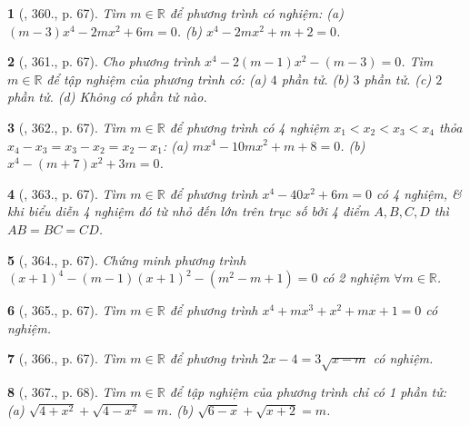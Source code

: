 \documentclass{article}
\newtheorem{baitoan}{}
\begin{document}
\begin{baitoan}[\cite{Binh_Toan_9_tap_2}, 360., p. 67]
	Tìm $m\in\mathbb{R}$ để phương trình có nghiệm: (a) $(m - 3)x^4 - 2mx^2 + 6m = 0$. (b) $x^4 - 2mx^2 + m + 2 = 0$.
\end{baitoan}

\begin{baitoan}[\cite{Binh_Toan_9_tap_2}, 361., p. 67]
	Cho phương trình $x^4 - 2(m - 1)x^2 - (m - 3) = 0$. Tìm $m\in\mathbb{R}$ để tập nghiệm của phương trình có: (a) $4$ phần tử. (b) $3$ phần tử. (c) $2$ phần tử. (d) Không có phần tử nào.
\end{baitoan}

\begin{baitoan}[\cite{Binh_Toan_9_tap_2}, 362., p. 67]
	Tìm $m\in\mathbb{R}$ để phương trình có 4 nghiệm $x_1 < x_2 < x_3 < x_4$ thỏa $x_4 - x_3 = x_3 - x_2 = x_2 - x_1$: (a) $mx^4 - 10mx^2 + m + 8 = 0$. (b) $x^4 - (m + 7)x^2 + 3m = 0$.
\end{baitoan}

\begin{baitoan}[\cite{Binh_Toan_9_tap_2}, 363., p. 67]
	Tìm $m\in\mathbb{R}$ để phương trình $x^4 - 40x^2 + 6m = 0$ có 4 nghiệm, \& khi biểu diễn 4 nghiệm đó từ nhỏ đến lớn trên trục số bởi 4 điểm $A,B,C,D$ thì $AB = BC = CD$.
\end{baitoan}

\begin{baitoan}[\cite{Binh_Toan_9_tap_2}, 364., p. 67]
	Chứng minh phương trình $(x + 1)^4 - (m - 1)(x + 1)^2 - (m^2 - m + 1) = 0$ có 2 nghiệm $\forall m\in\mathbb{R}$.
\end{baitoan}

\begin{baitoan}[\cite{Binh_Toan_9_tap_2}, 365., p. 67]
	Tìm $m\in\mathbb{R}$ để phương trình $x^4 + mx^3 + x^2 + mx + 1 = 0$ có nghiệm.
\end{baitoan}

\begin{baitoan}[\cite{Binh_Toan_9_tap_2}, 366., p. 67]
	Tìm $m\in\mathbb{R}$ để phương trình $2x - 4 = 3\sqrt{x - m}$ có nghiệm.
\end{baitoan}

\begin{baitoan}[\cite{Binh_Toan_9_tap_2}, 367., p. 68]
	Tìm $m\in\mathbb{R}$ để tập nghiệm của phương trình chỉ có 1 phần tử: (a) $\sqrt{4 + x^2} + \sqrt{4 - x^2} = m$. (b) $\sqrt{6 - x} + \sqrt{x + 2} = m$.
\end{baitoan}

\end{document}
